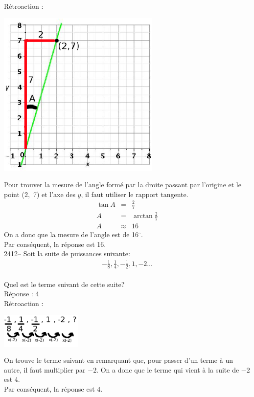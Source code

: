\documentclass[letterpaper, 12pt]{article}
\begin{document}
R\'etroaction :\\
\begin{center}
 \includegraphics[width=8cm,bb=14 14 582 582]{Q2411a.eps}
\end{center}
Pour trouver la mesure de l'angle form\'e par la droite passant par l'origine et le point \mbox{(2, 7)} et l'axe des $y$, il faut utiliser le rapport tangente.
\begin{eqnarray*}
 \tan{A}&=&\frac{2}{7}\\[2mm]
A&=&\arctan{\frac{2}{7}}\\[2mm]
A&\approx&16
\end{eqnarray*}
On a donc que la mesure de l'angle est de 16$^{\circ}$.\\
Par cons\'equent, la r\'eponse est 16.\\


2412-- Soit la suite de puissances suivante:\\
\begin{eqnarray*}
-\frac{1}{8}, \frac{1}{4}, -\frac{1}{2}, 1 , -2 \ldots
\end{eqnarray*}\\
Quel est le terme suivant de cette suite?\\

R\'eponse : 4\\

R\'etroaction :\\
\begin{center}
 \includegraphics[width=4cm,bb=0 714 302 842]{Q2412.eps}
\end{center}
On trouve le terme suivant en remarquant que, pour passer d'un terme \`a un autre, il faut multiplier par $-2$. On a donc que le terme qui vient \`a la suite de $-2$ est 4.\\
Par cons\'equent, la r\'eponse est 4.\\
\end{document}
